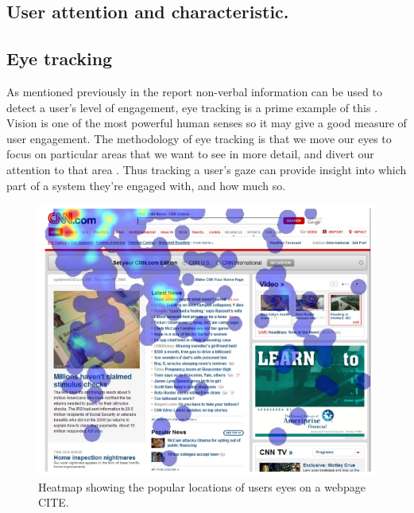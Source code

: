 \documentclass{article}
\begin{document}
\subsection{User attention and characteristic.}


\subsection{Eye tracking}

As mentioned previously in the report non-verbal information can be used to detect a
user’s level of engagement, eye tracking is a prime example of this \cite{lala2017detection}.
Vision is one of the most powerful human senses so it may give a good measure of user engagement. 
The methodology of eye tracking is that we move our eyes to focus on particular areas that we want to see in more detail, and divert our attention to that area \cite{duchowski2007eye}. 
Thus tracking a user’s gaze can provide insight into which part of a system they’re engaged with, and how much so.

\begin{figure}[ht]
    \centering
    \centerline{
        \includegraphics[scale=0.7]{EyeHeatmap.PNG}
    }
    \caption{Heatmap showing the popular locations of users eyes on a webpage CITE.}
    \label{fig:eyetrack}
\end{figure}
\end{document}
